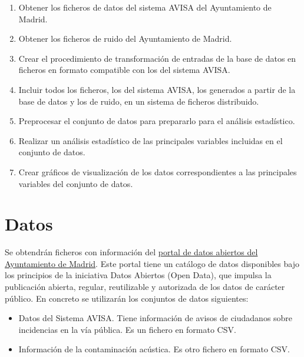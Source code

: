 \documentclass[
  a4paper,
]{scrreport}
\providecommand{\tightlist}{%
  \setlength{\itemsep}{0pt}\setlength{\parskip}{0pt}}\usepackage{longtable,booktabs,array}
\begin{document}
\begin{enumerate}
\def\labelenumi{\arabic{enumi}.}
\tightlist
\item
  Obtener los ficheros de datos del sistema AVISA del Ayuntamiento de
  Madrid.
\item
  Obtener los ficheros de ruido del Ayuntamiento de Madrid.
\item
  Crear el procedimiento de transformación de entradas de la base de
  datos en ficheros en formato compatible con los del sistema AVISA.
\item
  Incluir todos los ficheros, los del sistema AVISA, los generados a
  partir de la base de datos y los de ruido, en un sistema de ficheros
  distribuido.
\item
  Preprocesar el conjunto de datos para prepararlo para el análisis
  estadístico.
\item
  Realizar un análisis estadístico de las principales variables
  incluidas en el conjunto de datos.
\item
  Crear gráficos de visualización de los datos correspondientes a las
  principales variables del conjunto de datos.
\end{enumerate}

\hypertarget{datos}{%
\section{Datos}\label{datos}}

Se obtendrán ficheros con información del
\href{http://datos.madrid.es/portal/site/egob}{portal de datos abiertos
del Ayuntamiento de Madrid}. Este portal tiene un catálogo de datos
disponibles bajo los principios de la iniciativa Datos Abiertos (Open
Data), que impulsa la publicación abierta, regular, reutilizable y
autorizada de los datos de carácter público. En concreto se utilizarán
los conjuntos de datos siguientes:

\begin{itemize}
\tightlist
\item
  Datos del Sistema AVISA. Tiene información de avisos de ciudadanos
  sobre incidencias en la vía pública. Es un fichero en formato CSV.
\item
  Información de la contaminación acústica. Es otro fichero en formato
  CSV.
\end{itemize}
\end{document}
